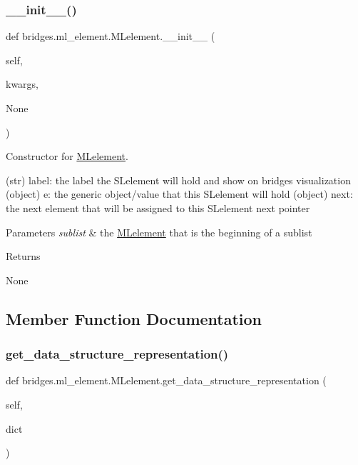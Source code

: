 \subsubsection{\texorpdfstring{\+\_\+\+\_\+init\+\_\+\+\_\+()}{\_\_init\_\_()}}
{\footnotesize\ttfamily def bridges.\+ml\+\_\+element.\+M\+Lelement.\+\_\+\+\_\+init\+\_\+\+\_\+ (\begin{DoxyParamCaption}\item[{}]{self,  }\item[{}]{kwargs,  }\item[{}]{None }\end{DoxyParamCaption})}



Constructor for \hyperlink{classbridges_1_1ml__element_1_1_m_lelement}{M\+Lelement}. 

(str) label\+: the label the S\+Lelement will hold and show on bridges visualization (object) e\+: the generic object/value that this S\+Lelement will hold (object) next\+: the next element that will be assigned to this S\+Lelement next pointer 
\begin{DoxyParams}{Parameters}
{\em sublist} & the \hyperlink{classbridges_1_1ml__element_1_1_m_lelement}{M\+Lelement} that is the beginning of a sublist \\
\hline
\end{DoxyParams}
\begin{DoxyReturn}{Returns}


None 
\end{DoxyReturn}


\subsection{Member Function Documentation}
\mbox{\label{classbridges_1_1ml__element_1_1_m_lelement_a7d176b966746a889f9234d4a76b99c0c}} 
\subsubsection{\texorpdfstring{get\+\_\+data\+\_\+structure\+\_\+representation()}{get\_data\_structure\_representation()}}
{\footnotesize\ttfamily def bridges.\+ml\+\_\+element.\+M\+Lelement.\+get\+\_\+data\+\_\+structure\+\_\+representation (\begin{DoxyParamCaption}\item[{}]{self,  }\item[{}]{dict }\end{DoxyParamCaption})}



